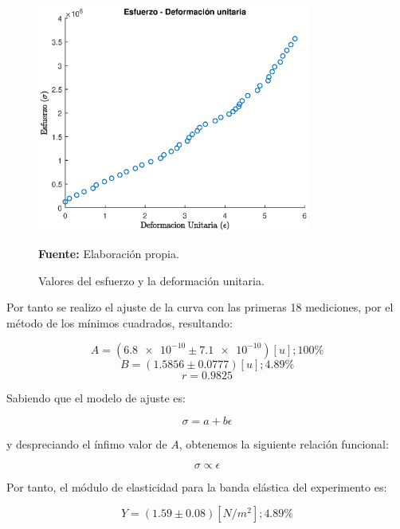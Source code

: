 \documentclass[letter,11pt]{article}
\newcommand{\source}[1]{\vspace{-11pt} \caption*{\small{\textbf{Fuente:} {#1}}}}
\begin{document}
\begin{figure}
\centering
\includegraphics[width=0.80\textwidth]{resources/m1.eps}
\caption{Valores del esfuerzo y la deformación unitaria.}
\label{figura4}
\source{Elaboración propia.}
\end{figure}

Por tanto se realizo el ajuste de la curva con las primeras 18 mediciones, por
el método de los mínimos cuadrados, resultando:

\begin{equation*}
    A = (\num{6.8e-10} \pm \num{7.1e-10}) [u]; 100 \%
\end{equation*}
\begin{equation*}
    B = (1.5856 \pm 0.0777) [u]; 4.89 \%
\end{equation*}
\begin{equation*}
    r = 0.9825
\end{equation*}

Sabiendo que el modelo de ajuste es:

\begin{equation*}
    \sigma = a + b \epsilon
\end{equation*}

y despreciando el ínfimo valor de $A$, obtenemos la siguiente relación
funcional:

\begin{equation*}
    \sigma \propto \epsilon
\end{equation*}

Por tanto, el módulo de elasticidad para la banda elástica del experimento es:

\begin{equation*}
    Y = (1.59 \pm 0.08) [N/m^2]; 4.89 \%
\end{equation*}
\end{document}
